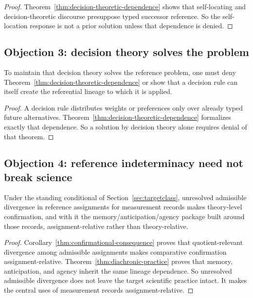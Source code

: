 \begin{proof}
Theorem~\ref{thm:decision-theoretic-dependence} shows that self-locating and
decision-theoretic discourse presuppose typed successor reference. So the self-location response is
not a prior solution unless that dependence is denied.
\end{proof}

\subsection{Objection 3: decision theory solves the problem}

\begin{proposition}
\label{prop:decision-downstream-objection}
To maintain that decision theory solves the reference problem, one must deny
Theorem~\ref{thm:decision-theoretic-dependence} or show that a decision rule can itself create the
referential lineage to which it is applied.
\end{proposition}

\begin{proof}
A decision rule distributes weights or preferences only over already typed future alternatives.
Theorem~\ref{thm:decision-theoretic-dependence} formalizes exactly that dependence. So a
solution by decision theory alone requires denial of that theorem.
\end{proof}

\subsection{Objection 4: reference indeterminacy need not break science}

\begin{theorem}
\label{thm:indeterminacy-breaks-science}
Under the standing conditional of Section~\ref{sec:targetclass}, unresolved admissible divergence in
reference assignments for measurement records makes theory-level confirmation, and with it the
memory/anticipation/agency package built around those records, assignment-relative rather than
theory-relative.
\end{theorem}

\begin{proof}
Corollary~\ref{thm:confirmational-consequence} proves that quotient-relevant divergence among
admissible assignments makes comparative confirmation assignment-relative. Theorem~\ref{thm:diachronic-practice}
proves that memory, anticipation, and agency inherit the same lineage dependence. So unresolved
admissible divergence does not leave the target scientific practice intact. It makes the central
uses of measurement records assignment-relative.
\end{proof}

